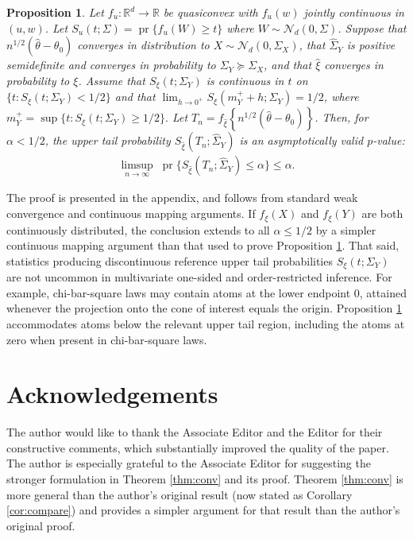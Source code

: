\documentclass[11pt]{article}
\newcommand{\1}{\mathbbm{1}}
\def\pr{{\operatorname{pr}}}
\theoremstyle{plain}
\newtheorem{proposition}[theorem]{Proposition}
\theoremstyle{definition}
\begin{document}
\begin{proposition}\label{prop:inference}
Let $f_u:\mathbb{R}^d\to \mathbb{R}$ be quasiconvex with $f_u(w)$ jointly continuous in $(u,w)$. Let $S_u(t;\Sigma) = \pr\{f_u(W)\geq t\}$ where $W\sim\mathcal{N}_d(0, \Sigma)$. Suppose that $n^{1/2}(\hat{\theta}-\theta_0)$ converges in distribution to $X\sim \mathcal{N}_d(0, \Sigma_X)$, that $\hat{\Sigma}_Y$ is positive semidefinite and converges in probability to $\Sigma_Y \succeq \Sigma_X$, and that $\hat{\xi}$ converges in probability to $\xi$. Assume that $S_{\xi}(t; \Sigma_Y)$ is continuous in $t$ on $\{t: S_{\xi}(t;\Sigma_Y) < 1/2\}$ and that $\lim_{h\rightarrow 0^+}S_{\xi}(m^+_{Y}+h;\Sigma_Y) = 1/2$, where $m^+_{Y} = \sup\{t:S_\xi(t;\Sigma_Y) \geq 1/2\}.$ Let $T_n = f_{\hat{\xi}}\left\{n^{1/2}(\hat{\theta}-\theta_0)\right\}$. Then, for $\alpha < 1/2$, the upper tail probability $S_{\hat{\xi}}(T_n; \hat{\Sigma}_Y)$ is an asymptotically valid $p$-value:
\begin{align*}
\underset{n\rightarrow\infty}\limsup\;\pr\{S_{\hat{\xi}}(T_n; \hat{\Sigma}_Y)\leq \alpha\}\leq \alpha.
\end{align*}
\end{proposition}




The proof is presented in the appendix, and follows from standard weak convergence and continuous mapping arguments. If $f_\xi(X)$ and $f_\xi(Y)$ are both continuously distributed, the conclusion extends to all $\alpha\leq 1/2$ by a simpler continuous mapping argument than that used to prove Proposition \ref{prop:inference}. That said, statistics producing discontinuous reference upper tail probabilities $S_\xi(t;\Sigma_Y)$ are not uncommon in multivariate one-sided and order-restricted inference. For example, chi-bar-square laws may contain atoms at the lower endpoint 0, attained whenever the projection onto the cone of interest equals the origin. Proposition \ref{prop:inference} accommodates atoms below the relevant upper tail region, including the atoms at zero when present in chi-bar-square laws.



\section*{Acknowledgements}
The author would like to thank the Associate Editor and the Editor for their constructive comments, which substantially improved the quality of the paper. The author is especially grateful to the Associate Editor for suggesting the stronger formulation in Theorem \ref{thm:conv} and its proof. Theorem \ref{thm:conv} is more general than the author's original result (now stated as Corollary \ref{cor:compare}) and provides a simpler argument for that result than the author's original proof.
\end{document}
